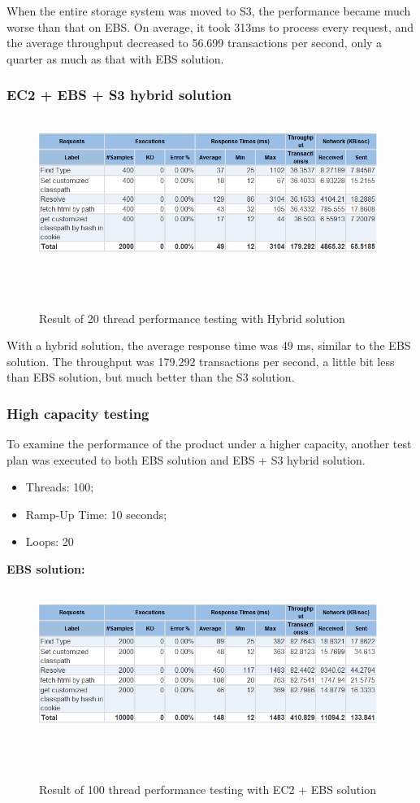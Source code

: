 \documentclass[runningheads]{llncs}
\begin{document}
When the entire storage system was moved to S3, the performance became much worse than that on EBS. On average, it took 313ms to process every request, and the average throughput decreased to 56.699 transactions per second, only a quarter as much as that with EBS solution.

\subsubsection{EC2 + EBS + S3 hybrid solution}
\begin{figure}[H]
    \centering
    \includegraphics[width=11cm]{pic/jmeter-hybrid.png}
    \caption{Result of 20 thread performance testing with Hybrid solution}
    \label{Result of 20 thread performance testing with Hybrid solution}
\end{figure}

With a hybrid solution, the average response time was 49 ms, similar to the EBS solution. The throughput was 179.292 transactions per second, a little bit less than EBS solution, but much better than the S3 solution.

\subsubsection{High capacity testing}
To examine the performance of the product under a higher capacity, another test plan was executed to both EBS solution and EBS + S3 hybrid solution.

\begin{itemize}
	\item Threads: 100;
	\item Ramp-Up Time: 10 seconds;
	\item Loops: 20
\end{itemize}

\textbf{EBS solution:}
\begin{figure}[H]
    \centering
    \includegraphics[width=11cm]{pic/jmeter-100-ebs.png}
    \caption{Result of 100 thread performance testing with EC2 + EBS solution}
    \label{Result of 100 thread performance testing with EC2 + EBS solution}
\end{figure}
\end{document}
